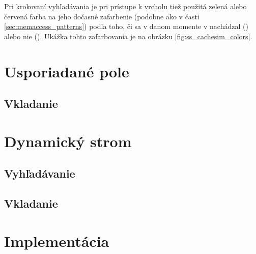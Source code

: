 Pri krokovaní vyhľadávania je pri prístupe k vrcholu tiež použitá zelená alebo červená farba na jeho dočasné zafarbenie (podobne ako v časti \ref{sec:memaccess_patterns}) podľa toho, či sa v danom momente v \cache nachádzal (\hit) alebo nie (\miss). Ukážka tohto zafarbovania je na obrázku \ref{fig:ss_cachesim_colors}.

\section{Usporiadané pole}
\subsection{Vkladanie}

\section{Dynamický strom}
\subsection{Vyhľadávanie}
\subsection{Vkladanie}

\section{Implementácia}

